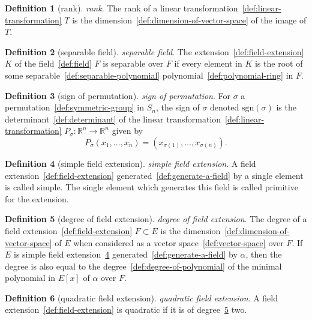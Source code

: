 \documentclass[12pt,a4paper]{article}
\theoremstyle{definition}
\newtheorem{definition}{Definition}
\begin{document}
\begin{definition}[rank]\label{def:rank}
\emph{rank}. The rank of a linear transformation~\ref{def:linear-transformation} $T$ is the dimension~\ref{def:dimension-of-vector-space} of the image of $T$.
\end{definition}

\begin{definition}[separable field]\label{def:separable-field}
\emph{separable field}. The extension~\ref{def:field-extension} $K$ of the field~\ref{def:field} $F$ is separable over $F$ if every element in $K$ is the root of some separable~\ref{def:separable-polynomial} polynomial~\ref{def:polynomial-ring} in $F$.
\end{definition}

\begin{definition}[sign of permutation]\label{def:sign-of-permutation}
\emph{sign of permutation}. For $\sigma$ a permutation~\ref{def:symmetric-group} in $S_n$, the sign of $\sigma$ denoted $\text{sgn}(\sigma)$ is the determinant~\ref{def:determinant} of the linear transformation~\ref{def:linear-transformation} $P_\sigma:\mathbb R^n\to\mathbb R^n$ given by $$P_\sigma(x_1,\dots,x_n) =(x_{\sigma(1)},\dots, x_{\sigma(n)}).$$
\end{definition}

\begin{definition}[simple field extension]\label{def:simple-field-extension}
\emph{simple field extension}. A field extension~\ref{def:field-extension} generated~\ref{def:generate-a-field} by a single element is called simple. The single element which generates this field is called primitive for the extension.
\end{definition}

\begin{definition}[degree of field extension]\label{def:degree-of-field-extension}
\emph{degree of field extension}. The degree of a field extension~\ref{def:field-extension} $F \subset E$ is the dimension~\ref{def:dimension-of-vector-space} of $E$ when considered as a vector space~\ref{def:vector-space} over $F$. If $E$ is simple field extension~\ref{def:simple-field-extension} generated~\ref{def:generate-a-field} by $\alpha$, then the degree is also equal to the degree~\ref{def:degree-of-polynomial} of the minimal polynomial in $E[x]$ of $\alpha$ over $F$.
\end{definition}

\begin{definition}[quadratic field extension]\label{def:quadratic-field-extension}
\emph{quadratic field extension}. A field extension~\ref{def:field-extension} is quadratic if it is of degree~\ref{def:degree-of-field-extension} two.
\end{definition}
\end{document}

